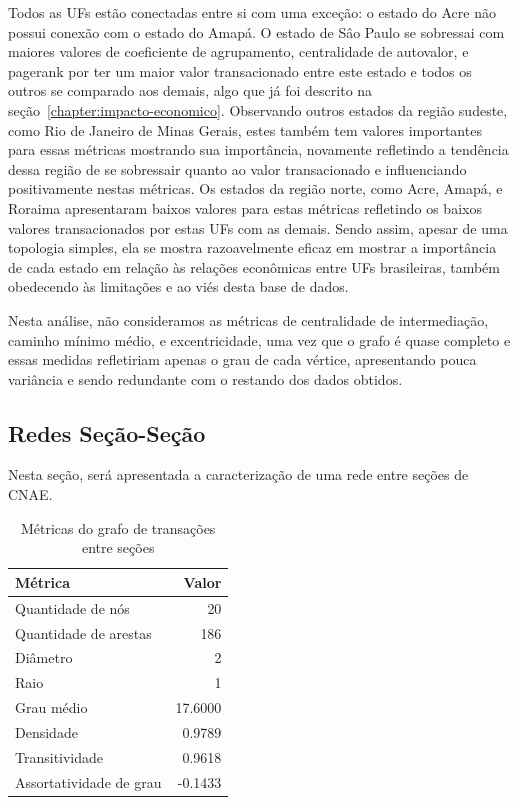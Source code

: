 Todos as UFs estão conectadas entre si com uma exceção: o estado do Acre não possui conexão com o estado do Amapá. O estado de Sâo Paulo se sobressai com maiores valores de coeficiente de agrupamento, centralidade de autovalor, e pagerank por ter um maior valor transacionado entre este estado e todos os outros se comparado aos demais, algo que já foi descrito na seção~\ref{chapter:impacto-economico}. Observando outros estados da região sudeste, como Rio de Janeiro de Minas Gerais, estes também tem valores importantes para essas métricas mostrando sua importância, novamente refletindo a tendência dessa região de se sobressair quanto ao valor transacionado e influenciando positivamente nestas métricas. Os estados da região norte, como Acre, Amapá, e Roraima apresentaram baixos valores para estas métricas refletindo os baixos valores transacionados por estas UFs com as demais. Sendo assim, apesar de uma topologia simples, ela se mostra razoavelmente eficaz em mostrar a importância de cada estado em relação às relações econômicas entre UFs brasileiras, também obedecendo às limitações e ao viés desta base de dados.

Nesta análise, não consideramos as métricas de centralidade de intermediação, caminho mínimo médio, e excentricidade, uma vez que o grafo é quase completo e essas medidas refletiriam apenas o grau de cada vértice, apresentando pouca variância e sendo redundante com o restando dos dados obtidos.

\subsection{Redes Seção-Seção}
\label{section:metricas-redes:secao}

Nesta seção, será apresentada a caracterização de uma rede entre seções de CNAE.

\begin{table}[htb]
\centering
\caption{Métricas do grafo de transações entre seções}
\label{tab:metricas-redes:grafo-por-secao}
    \begin{tabular}{l|r}
    \toprule
    Métrica &  Valor \\
    \midrule
    Quantidade de nós       &   20      \\
    Quantidade de arestas   &  186      \\
    Diâmetro                &    2      \\
    Raio                    &    1      \\
    Grau médio              &   17.6000 \\
    Densidade               &    0.9789 \\
    Transitividade          &    0.9618 \\
    Assortatividade de grau &   -0.1433 \\
    \bottomrule
    \end{tabular}
\fdadospesquisa
\end{table}

